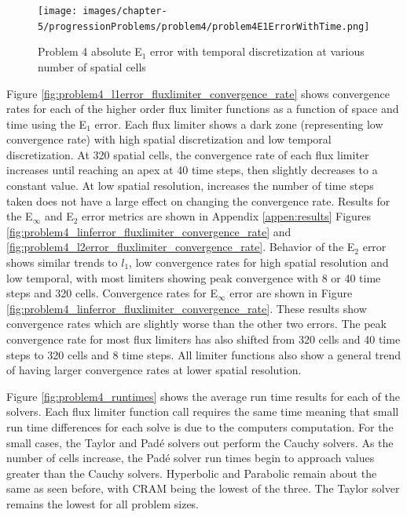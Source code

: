 \clearpage

\begin{figure}[p]
    \centering
    \texttt{[image: images/chapter-5/progressionProblems/problem4/problem4E1ErrorWithTime.png]}
    \caption{Problem 4 absolute E${}_{1}$ error with temporal discretization at various number of spatial cells}
    \label{fig:problem4_l1error_time_results}
\end{figure}

\clearpage

Figure \ref{fig:problem4_l1error_fluxlimiter_convergence_rate} shows convergence rates for each of the higher order flux limiter functions as a function of space and time using the E${}_{1}$ error. Each flux limiter shows a dark zone (representing low convergence rate) with high spatial discretization and low temporal discretization. At 320 spatial cells, the convergence rate of each flux limiter increases until reaching an apex at 40 time steps, then slightly decreases to a constant value. At low spatial resolution, increases the number of time steps taken does not have a large effect on changing the convergence rate. Results for the E${}_{\infty}$ and E${}_{2}$ error metrics are shown in Appendix \ref{appen:results} Figures \ref{fig:problem4_linferror_fluxlimiter_convergence_rate} and \ref{fig:problem4_l2error_fluxlimiter_convergence_rate}. Behavior of the E${}_{2}$ error shows similar trends to $l_{1}$, low convergence rates for high spatial resolution and low temporal, with most limiters showing peak convergence with 8 or 40 time steps and 320 cells. Convergence rates for E${}_{\infty}$ error are shown in Figure \ref{fig:problem4_linferror_fluxlimiter_convergence_rate}. These results show convergence rates which are slightly worse than the other two errors. The peak convergence rate for most flux limiters has also shifted from 320 cells and 40 time steps to 320 cells and 8 time steps. All limiter functions also show a general trend of having larger convergence rates at lower spatial resolution. 

Figure \ref{fig:problem4_runtimes} shows the average run time results for each of the solvers. Each flux limiter function call requires the same time meaning that small run time differences for each solve is due to the computers computation. For the small cases, the Taylor and Pad\'e solvers out perform the Cauchy solvers. As the number of cells increase, the Pad\'e solver run times begin to approach values greater than the Cauchy solvers. Hyperbolic and Parabolic remain about the same as seen before, with CRAM being the lowest of the three. The Taylor solver remains the lowest for all problem sizes. 

